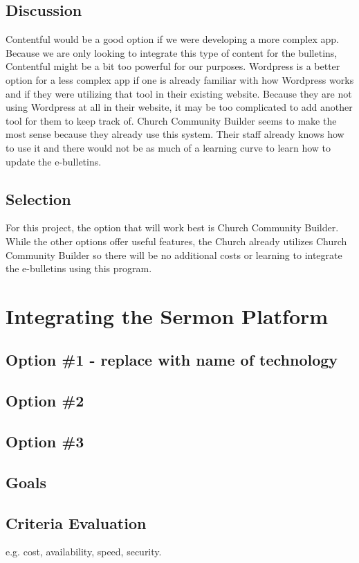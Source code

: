 \documentclass[letterpaper,10pt,draftclsnofoot,onecolumn,titlepage]{IEEEtran}
\begin{document}
	\subsection{Discussion}
	Contentful would be a good option if we were developing a more complex app.
	Because we are only looking to integrate this type of content for the bulletins, Contentful might be a bit too powerful for our purposes. 
	Wordpress is a better option for a less complex app if one is already familiar with how Wordpress works and if they were utilizing that tool in their existing website. 
	Because they are not using Wordpress at all in their website, it may be too complicated to add another tool for them to keep track of. 
	Church Community Builder seems to make the most sense because they already use this system. 
	Their staff already knows how to use it and there would not be as much of a learning curve to learn how to update the e-bulletins. 
	
	\subsection{Selection}
	For this project, the option that will work best is Church Community Builder. 
	While the other options offer useful features, the Church already utilizes Church Community Builder so there will be no additional costs or learning to integrate the e-bulletins using this program. 
	
	\section{Integrating the Sermon Platform}
	\subsection{Option \#1 - replace with name of technology}
	\subsection{Option \#2}
	\subsection{Option \#3}
	\subsection{Goals}
	\subsection{Criteria Evaluation}
	e.g. cost, availability, speed, security.
\end{document}
